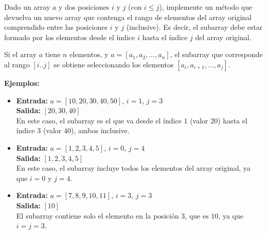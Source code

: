 Dado un array \(a\) y dos posiciones \(i\) y \(j\) (con \(i \leq j\)), implemente un método que devuelva un nuevo array que contenga el rango de elementos del array original comprendido entre las posiciones \(i\) y \(j\) (inclusive). Es decir, el subarray debe estar formado por los elementos desde el índice \(i\) hasta el índice \(j\) del array original.

Si el array \(a\) tiene \(n\) elementos, y \(a = [a_1, a_2, \dots, a_n]\), el subarray que corresponde al rango \([i..j]\) se obtiene seleccionando los elementos \([a_i, a_{i+1}, \dots, a_j]\).

\textbf{Ejemplos:}
\begin{itemize}
    \item \textbf{Entrada:} \(a = [10, 20, 30, 40, 50]\), \(i = 1\), \(j = 3\) \\
    \textbf{Salida:} \([20, 30, 40]\) \\
    En este caso, el subarray es el que va desde el índice \(1\) (valor \(20\)) hasta el índice \(3\) (valor \(40\)), ambos inclusive.

    \item \textbf{Entrada:} \(a = [1, 2, 3, 4, 5]\), \(i = 0\), \(j = 4\) \\
    \textbf{Salida:} \([1, 2, 3, 4, 5]\) \\
    En este caso, el subarray incluye todos los elementos del array original, ya que \(i = 0\) y \(j = 4\).
    
    \item \textbf{Entrada:} \(a = [7, 8, 9, 10, 11]\), \(i = 3\), \(j = 3\) \\
    \textbf{Salida:} \([10]\) \\
    El subarray contiene solo el elemento en la posición \(3\), que es \(10\), ya que \(i = j = 3\).
\end{itemize}